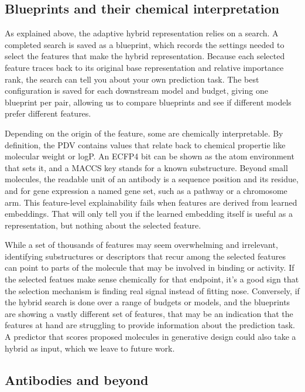 \subsection{Blueprints and their chemical interpretation}

As explained above, the adaptive hybrid representation relies on a search. A completed search is saved as a blueprint, which records the settings needed to select the features that make the hybrid representation. Because each selected feature traces back to its original base representation and relative importance rank, the search can tell you about your own prediction task. The best configuration is saved for each downstream model and budget, giving one blueprint per pair, allowing us to compare blueprints and see if different models prefer different features. 

Depending on the origin of the feature, some are chemically interpretable. By definition, the PDV contains values that relate back to chemical propertie like molecular weight or logP. An ECFP4 bit can be shown as the atom environment that sets it, and a MACCS key stands for a known substructure. Beyond small molecules, the readable unit of an antibody is a sequence position and its residue, and for gene expression a named gene set, such as a pathway or a chromosome arm. This feature-level explainability fails when features are derived from learned embeddings. That will only tell you if the learned embedding itself is useful as a representation, but nothing about the selected feature. 

While a set of thousands of features may seem overwhelming and irrelevant, identifying substructures or descriptors that recur among the selected features can point to parts of the molecule that may be involved in binding or activity. If the selected featues make sense chemically for that endpoint, it's a good sign that the selection mechanism is finding real signal instead of fitting nose. Conversely, if the hybrid search is done over a range of budgets or models, and the blueprints are showing a vastly different set of features, that may be an indication that the features at hand are struggling to provide information about the prediction task. A predictor that scores proposed molecules in generative design \citep{Olivecrona2017} could also take a hybrid as input, which we leave to future work.

\subsection{Antibodies and beyond}


